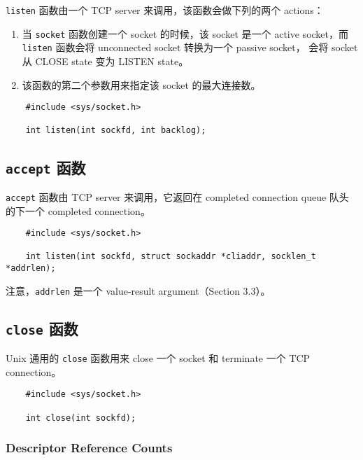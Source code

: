     \texttt{listen} 函数由一个 TCP server 来调用，该函数会做下列的两个 actions：

    \begin{enumerate}
      \item 当 \texttt{socket} 函数创建一个 socket 的时候，该 socket 是一个 active socket，而 \texttt{listen} 函数会将 unconnected socket 转换为一个 passive socket，
        会将 socket 从 CLOSE state 变为 LISTEN state。
      \item 该函数的第二个参数用来指定该 socket 的最大连接数。
    \end{enumerate}

    \begin{verbatim}
    #include <sys/socket.h>

    int listen(int sockfd, int backlog);
    \end{verbatim}

  \subsection{\texttt{accept} 函数}
  
    \texttt{accept} 函数由 TCP server 来调用，它返回在 completed connection queue 队头的下一个 completed connection。

    \begin{verbatim}
    #include <sys/socket.h>

    int listen(int sockfd, struct sockaddr *cliaddr, socklen_t *addrlen);
    \end{verbatim}

    注意，\texttt{addrlen} 是一个 value-result argument（Section 3.3）。

  \subsection{\texttt{close} 函数}

    Unix 通用的 \texttt{close} 函数用来 close 一个 socket 和 terminate 一个 TCP connection。

    \begin{verbatim}
    #include <sys/socket.h>

    int close(int sockfd);
    \end{verbatim}
    
    \subsubsection{Descriptor Reference Counts}

